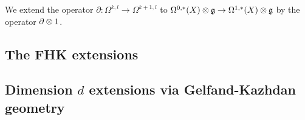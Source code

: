 \begin{rmk} We extend the operator $\partial : \Omega^{k,l} \to \Omega^{k+1,l}$ to $\Omega^{0,*}(X) \otimes \mathfrak g \to \Omega^{1,*}(X)\otimes \mathfrak g$ by the operator $\partial \otimes 1$. 
\end{rmk}


\subsection{The FHK extensions}

\subsection{Dimension $d$ extensions via Gelfand-Kazhdan geometry}


